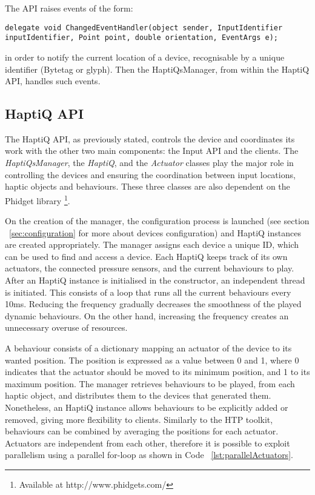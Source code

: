 The API raises events of the form:
\lstset{style=sharpc1}
\begin{lstlisting}
delegate void ChangedEventHandler(object sender, InputIdentifier inputIdentifier, Point point, double orientation, EventArgs e);
\end{lstlisting}

in order to notify the current location of a device, recognisable by a unique identifier (Bytetag or glyph). Then the HaptiQsManager, from within the HaptiQ API, handles such events.  

\subsection{HaptiQ API}

The HaptiQ API, as previously stated, controls the device and coordinates its work with the other two main components: the Input API and the clients. The \textit{HaptiQsManager}, the \textit{HaptiQ}, and the \textit{Actuator} classes play the major role in controlling the devices and ensuring the coordination between input locations, haptic objects and behaviours. These three classes are also dependent on the Phidget library \footnote{Available at http://www.phidgets.com/}. 

On the creation of the manager, the configuration process is launched (see section ~\ref{sec:configuration} for more about devices configuration) and HaptiQ instances are created appropriately. The manager assigns each device a unique ID, which can be used to find and access a device. 
Each HaptiQ keeps track of its own actuators, the connected pressure sensors, and the current behaviours to play. After an HaptiQ instance is initialised in the constructor, an independent thread is initiated. This consists of a loop that runs all the current behaviours every 10ms. Reducing the frequency gradually decreases the smoothness of the played dynamic behaviours. On the other hand, increasing the frequency creates an unnecessary overuse of resources. 

A behaviour consists of a dictionary mapping an actuator of the device to its wanted position. The position is expressed as a value between 0 and 1, where 0 indicates that the actuator should be moved to its minimum position, and 1 to its maximum position. The manager retrieves behaviours to be played, from each haptic object, and distributes them to the devices that generated them. Nonetheless, an HaptiQ instance allows behaviours to be explicitly added or removed, giving more flexibility to clients. Similarly to the HTP toolkit, behaviours can be combined by averaging the positions for each actuator. 
Actuators are independent from each other, therefore it is possible to exploit parallelism using a parallel for-loop as shown in Code ~\ref{lst:parallelActuators}.

